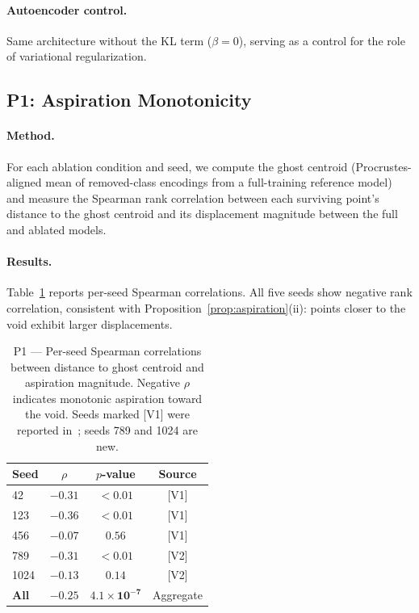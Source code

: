 \documentclass[11pt]{article}
\begin{document}
\paragraph{Autoencoder control.}
Same architecture without the KL term ($\beta = 0$), serving as a control
for the role of variational regularization.


\subsection{P1: Aspiration Monotonicity}
\label{sec:p1}

\paragraph{Method.}
For each ablation condition and seed, we compute the ghost centroid
(Procrustes-aligned mean of removed-class encodings from a full-training
reference model) and measure the Spearman rank correlation between each
surviving point's distance to the ghost centroid and its displacement
magnitude between the full and ablated models.

\paragraph{Results.}
Table~\ref{tab:p1} reports per-seed Spearman correlations.
All five seeds show negative rank correlation, consistent with
Proposition~\ref{prop:aspiration}(ii): points closer to the void exhibit
larger displacements.

\begin{table}[t]
\centering
\caption{P1 --- Per-seed Spearman correlations between distance to ghost
centroid and aspiration magnitude.
Negative $\rho$ indicates monotonic aspiration toward the void.
Seeds marked [V1] were reported in~\citet{rigaud2026gap}; seeds 789 and
1024 are new.}
\label{tab:p1}
\begin{tabular}{lccc}
\toprule
Seed & $\rho$ & $p$-value & Source \\
\midrule
42   & $-0.31$ & $< 0.01$  & [V1] \\
123  & $-0.36$ & $< 0.01$  & [V1] \\
456  & $-0.07$ & $0.56$    & [V1] \\
789  & $-0.31$ & $< 0.01$  & [V2] \\
1024 & $-0.13$ & $0.14$    & [V2] \\
\midrule
\textbf{All} & $\mathbf{-0.25}$ & $\mathbf{4.1 \times 10^{-7}}$ & Aggregate \\
\bottomrule
\end{tabular}
\end{table}
\end{document}
